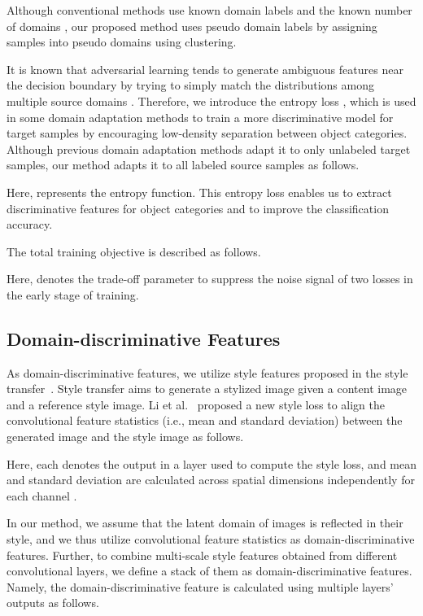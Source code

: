 \documentclass[letterpaper]{article} \usepackage{aaai20}  \usepackage{times}  \usepackage{helvet} \usepackage{courier}  \usepackage[hyphens]{url}  \usepackage{graphicx} \urlstyle{rm} \def\UrlFont{\rm}  \usepackage{graphicx}  \usepackage[whole]{bxcjkjatype}
\begin{document}
Although conventional methods use known domain labels  and the known number of domains , our proposed method uses pseudo domain labels  by assigning samples into  pseudo domains using clustering.\par
It is known that adversarial learning tends to generate ambiguous features near the decision boundary by trying to simply match the distributions among multiple source domains \cite{MCD}. Therefore, we introduce the entropy loss  \cite{entropy}, which is used in some domain adaptation methods \cite{RTN,SymNets} to train a more discriminative model for target samples by encouraging low-density separation between object categories. Although previous domain adaptation methods adapt it to only unlabeled target samples, our method adapts it to all labeled source samples as follows.

Here,  represents the entropy function. This entropy loss enables us to extract discriminative features for object categories and to improve the classification accuracy.\par
The total training objective is described as follows.

Here,  denotes the trade-off parameter to suppress the noise signal of two losses  in the early stage of training.

\subsection{Domain-discriminative Features}
As domain-discriminative features, we utilize style features proposed in the style transfer~\cite{Gatys,Li,AdaIN}. Style transfer aims to generate a stylized image given a content image and a reference style image.
Li et al.~\cite{Li} proposed a new style loss  to align the convolutional feature statistics (i.e., mean and standard deviation) between the generated image  and the style image  as follows.


Here, each  denotes the output in a layer used to compute the style loss, and mean  and standard deviation  are calculated across spatial dimensions independently for each channel .
\par
In our method, we assume that the latent domain of images is reflected in their style, and we thus utilize convolutional feature statistics as domain-discriminative features. Further, to combine multi-scale style features obtained from different convolutional layers, we define a stack of them as domain-discriminative features.
Namely, the domain-discriminative feature  is calculated using multiple layers' outputs  as follows.
\end{document}
